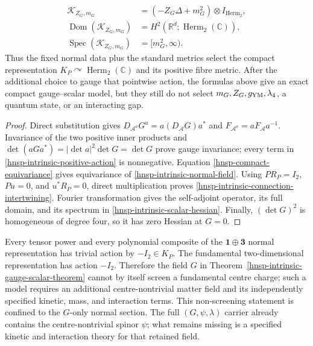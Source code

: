 \begin{theorem}
\begin{equation}
 \begin{aligned}
  \mathcal K_{Z_G,m_G}
   &=(-Z_G\Delta+m_G^2)\otimes I_{\operatorname{Herm}_2},\\
  \operatorname{Dom}(\mathcal K_{Z_G,m_G})
   &=H^2(\mathbb R^d;\operatorname{Herm}_2(\mathbb C)),\\
  \operatorname{Spec}(\mathcal K_{Z_G,m_G})
   &=[m_G^2,\infty).
 \end{aligned}
 \label{hnsp-intrinsic-scalar-hessian}
\end{equation}
Thus the fixed normal data plus the standard metrics select the compact
representation \(K_P\curvearrowright\operatorname{Herm}_2(\mathbb C)\) and
its positive fibre metric.  After the additional choice to gauge that
pointwise action, the formulas above give an exact compact gauge--scalar
model, but they still do not select \(m_G,Z_G,g_{\rm YM},\lambda_4\), a quantum
state, or an interacting gap.
\end{theorem}

\begin{proof}
Direct substitution gives
\(D_{\mathcal A^a}G^a=a(D_{\mathcal A}G)a^*\) and
\(F_{\mathcal A^a}=aF_{\mathcal A}a^{-1}\).  Invariance of the two positive
inner products and
\(\det(aGa^*)=|\det a|^2\det G=\det G\) prove gauge invariance; every term in
\eqref{hnsp-intrinsic-positive-action} is nonnegative.  Equation
\eqref{hnsp-compact-equivariance} gives equivariance of
\eqref{hnsp-intrinsic-normal-field}.  Using \(PR_P=I_2\), \(Pu=0\), and
\(u^*R_P=0\), direct multiplication proves
\eqref{hnsp-intrinsic-connection-intertwining}.  Fourier transformation gives
the self-adjoint operator, its full domain, and its spectrum in
\eqref{hnsp-intrinsic-scalar-hessian}.  Finally, \((\det G)^2\) is homogeneous
of degree four, so it has zero Hessian at \(G=0\).
\end{proof}

\begin{corollary}
\label{hnsp-centre-screening-corollary}
Every tensor power and every polynomial composite of the
\(\boldsymbol 1\oplus\boldsymbol 3\) normal representation has trivial
action by \(-I_2\in K_P\).  The fundamental two-dimensional representation
has action \(-I_2\).  Therefore the field \(G\) in
Theorem~\ref{hnsp-intrinsic-gauge-scalar-theorem} cannot by itself screen a
fundamental centre charge; such a model requires an additional
centre-nontrivial matter field and its independently specified kinetic,
mass, and interaction terms.
This non-screening statement is confined to the \(G\)-only normal section.
The full \((G,\psi,\lambda)\) carrier already contains the centre-nontrivial
spinor \(\psi\); what remains missing is a specified kinetic and interaction
theory for that retained field.
\end{corollary}

